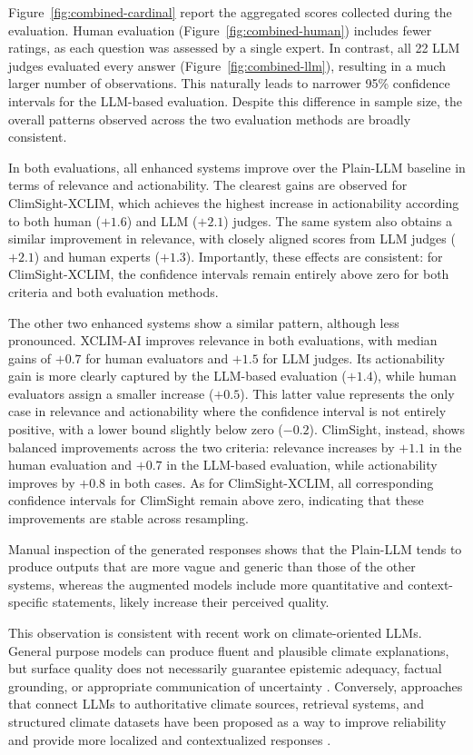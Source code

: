 Figure~\ref{fig:combined-cardinal} report the aggregated scores collected during the evaluation. Human evaluation (Figure~\ref{fig:combined-human}) includes fewer ratings, as each question was assessed by a single expert. In contrast, all 22 LLM judges evaluated every answer (Figure~\ref{fig:combined-llm}), resulting in a much larger number of observations. This naturally leads to narrower 95\% confidence intervals for the LLM-based evaluation. Despite this difference in sample size, the overall patterns observed across the two evaluation methods are broadly consistent.

In both evaluations, all enhanced systems improve over the Plain-LLM baseline in terms of relevance and actionability.
The clearest gains are observed for ClimSight-XCLIM, which achieves the highest increase in actionability according to both human ($+1.6$) and LLM ($+2.1$) judges.
The same system also obtains a similar improvement in relevance, with closely aligned scores from LLM judges ($+2.1$) and human experts ($+1.3$).
Importantly, these effects are consistent: for ClimSight-XCLIM, the confidence intervals remain entirely above zero for both criteria and both evaluation methods.

The other two enhanced systems show a similar pattern, although less pronounced.
XCLIM-AI improves relevance in both evaluations, with median gains of $+0.7$ for human evaluators and $+1.5$ for LLM judges.
Its actionability gain is more clearly captured by the LLM-based evaluation ($+1.4$), while human evaluators assign a smaller increase ($+0.5$).
This latter value represents the only case in relevance and actionability where the confidence interval is not entirely positive, with a lower bound slightly below zero ($-0.2$).
ClimSight, instead, shows balanced improvements across the two criteria: relevance increases by $+1.1$ in the human evaluation and $+0.7$ in the LLM-based evaluation, while actionability improves by $+0.8$ in both cases.
As for ClimSight-XCLIM, all corresponding confidence intervals for ClimSight remain above zero, indicating that these improvements are stable across resampling.

Manual inspection of the generated responses shows that the Plain-LLM tends to produce outputs that are more vague and generic than those of the other systems, whereas the augmented models include more quantitative and context-specific statements, likely increase their perceived quality.

This observation is consistent with recent work on climate-oriented LLMs.
General purpose models can produce fluent and plausible climate explanations, but surface quality does not necessarily guarantee epistemic adequacy, factual grounding, or appropriate communication of uncertainty \citep{bulian_assessing_2024}.
Conversely, approaches that connect LLMs to authoritative climate sources, retrieval systems, and structured climate datasets have been proposed as a way to improve reliability and provide more localized and contextualized responses \citep{vaghefi_chatclimate_2023}.

